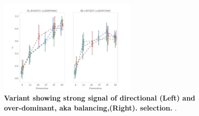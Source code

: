 \begin{figure}[H]
	\centering
	\includegraphics[trim=0.1in 0 .08in 0.02in , 
	clip,width=0.6\textwidth]{figures/topSNPs.pdf}
	\caption{ {\bf Variant showing strong signal of directional (Left) and 
	over-dominant, 	aka balancing,(Right). 
			selection.}  . }
	\label{fig:dir-bal}
\end{figure}


